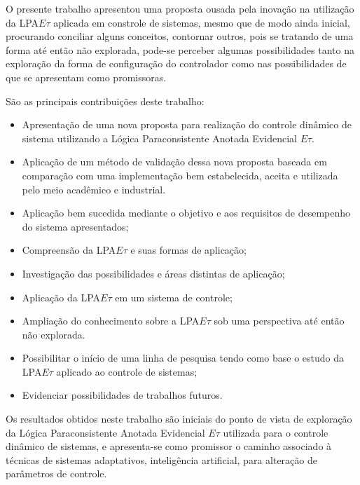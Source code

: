 O presente trabalho apresentou uma proposta ousada pela inovação na
utilização da LPA$E\tau$ aplicada em constrole de sistemas, mesmo que
de modo ainda inicial, procurando conciliar alguns conceitos,
contornar outros, pois se tratando de uma forma até então não
explorada, pode-se perceber algumas possibilidades
tanto na exploração da forma de configuração do controlador como nas
possibilidades de que se apresentam
como promissoras.


São as principais contribuições deste trabalho:

\begin{itemize}

\item Apresentação de uma nova proposta para realização do controle dinâmico de sistema utilizando a Lógica Paraconsistente Anotada Evidencial $E\tau$.

\item Aplicação de um método de validação dessa nova proposta baseada em comparação com uma implementação bem estabelecida, aceita e utilizada pelo meio acadêmico e industrial.

\item Aplicação bem sucedida mediante o objetivo e aos requisitos de desempenho do sistema apresentados;

\item Compreensão da LPA$E\tau$ e suas formas de aplicação;

\item Investigação das possibilidades e áreas distintas de aplicação;

\item Aplicação da LPA$E\tau$ em um sistema de controle;

\item Ampliação do conhecimento sobre a LPA$E\tau$ sob uma perspectiva até então não explorada.

\item Possibilitar o início de uma linha de pesquisa tendo como base o estudo da LPA$E\tau$ aplicado ao controle de sistemas;

\item Evidenciar possibilidades de trabalhos futuros.

\end{itemize}


Os resultados obtidos neste trabalho são iniciais do ponto de vista de exploração da Lógica Paraconsistente Anotada Evidencial $E\tau$ utilizada para o controle dinâmico de sistemas, e apresenta-se como promissor o caminho associado à técnicas de sistemas adaptativos, inteligência artificial, para alteração de parâmetros de controle.


